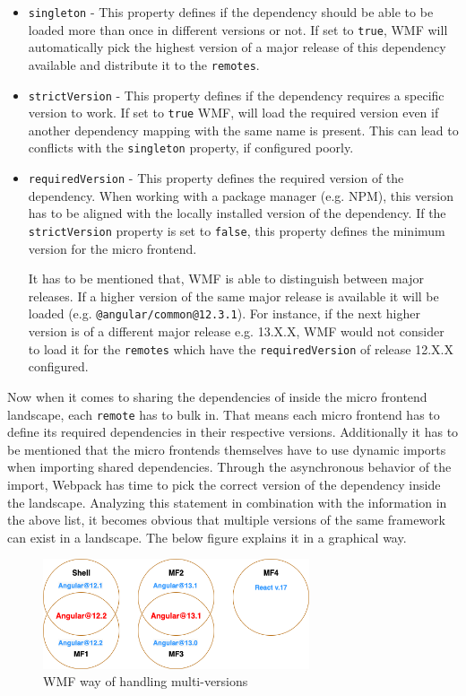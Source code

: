 \begin{itemize}
	\item \texttt{singleton} - This property defines if the dependency should be able to be loaded more than once in different versions or not. If set to \texttt{true}, WMF will automatically pick the highest version of a major release of this dependency available and distribute it to the \texttt{remotes}.\cite{wmf_version_mismatch}
	
	\item \texttt{strictVersion} - This property defines if the dependency requires a specific version to work. If set to \texttt{true} WMF, will load the required version even if another dependency mapping with the same name is present. This can lead to conflicts with the \texttt{singleton} property, if configured poorly.
	
	\item \texttt{requiredVersion} - This property defines the required version of the dependency. When working with a package manager (e.g. NPM), this version has to be aligned with the locally installed version of the dependency. If the \texttt{strictVersion} property is set to \texttt{false}, this property defines the minimum version for the micro frontend. 
	
	It has to be mentioned that, WMF is able to distinguish between major releases. If a higher version of the same major release is available it will be loaded (e.g. \texttt{@angular/common@12.3.1}). For instance, if the next higher version is of a different major release e.g. 13.X.X, WMF would not consider to load it for the \texttt{remotes} which have the \texttt{requiredVersion} of release 12.X.X configured.
\end{itemize}

Now when it comes to sharing the dependencies of inside the micro frontend landscape, each \texttt{remote} has to bulk in. That means each micro frontend has to define its required dependencies in their respective versions. Additionally it has to be mentioned that the micro frontends themselves have to use dynamic imports when importing shared dependencies. Through the asynchronous behavior of the import, Webpack has time to pick the correct version of the dependency inside the landscape.\cite{wmf_concepts}
Analyzing this statement in combination with the information in the above list, it becomes obvious that multiple versions of the same framework can exist in a landscape. The below figure explains it in a graphical way.

\begin{figure}[!h]
	\centering
	\includegraphics[width=0.7\textwidth]{Figures/multi_version_diagramm.drawio.png}
	\caption{WMF way of handling multi-versions}
	\label{fig:wmf_multiversions}
\end{figure}

